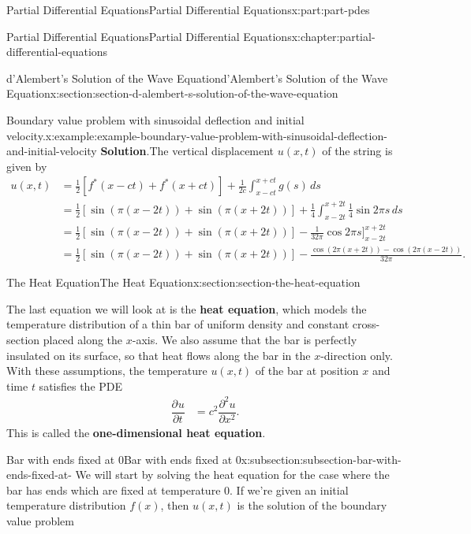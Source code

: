 \documentclass[oneside,10pt,]{book}
\newcommand{\blocktitlefont}{\relax}
\newcommand{\terminology}[1]{\textbf{#1}}
\numberwithin{equation}{part}
\newcommand{\pdv}[3][]{\dfrac{\partial^{#1} #2}{\partial #3^{#1}}}
\newcommand{\amp}{&}
\begin{document}
\begin{partptx}{Partial Differential Equations}{}{Partial Differential Equations}{}{}{x:part:part-pdes}
\begin{chapterptx}{Partial Differential Equations}{}{Partial Differential Equations}{}{}{x:chapter:partial-differential-equations}
\begin{sectionptx}{d'Alembert's Solution of the Wave Equation}{}{d'Alembert's Solution of the Wave Equation}{}{}{x:section:section-d-alembert-s-solution-of-the-wave-equation}
\begin{example}{Boundary value problem with sinusoidal deflection and initial velocity.}{x:example:example-boundary-value-problem-with-sinusoidal-deflection-and-initial-velocity}
\noindent\textbf{\blocktitlefont Solution}.\hypertarget{g:solution:idp105548780936096}{}\quad{}The vertical displacement \(u(x,t)\) of the string is given by%
%
\begin{align*}
u(x,t) \amp = \frac{1}{2}[f^{*}(x-ct)+f^{*}(x+ct)] + \frac{1}{2c}\int_{x-ct}^{x+ct}g(s)\,ds \\
\amp = \frac{1}{2}[\sin(\pi(x-2t))+\sin(\pi(x+2t))] + \frac{1}{4}\int_{x-2t}^{x+2t}\frac{1}{4}\sin2\pi s\,ds \\
\amp = \frac{1}{2}[\sin(\pi(x-2t))+\sin(\pi(x+2t))] - \frac{1}{32\pi}\cos2\pi s\Bigg]_{x-2t}^{x+2t} \\
\amp = \frac{1}{2}[\sin(\pi(x-2t))+\sin(\pi(x+2t))] - \frac{\cos(2\pi(x+2t)) - \cos(2\pi(x-2t))}{32\pi} \text{.}
\end{align*}
\end{example}
\end{sectionptx}
%
%
\typeout{************************************************}
\typeout{************************************************}
%
\begin{sectionptx}{The Heat Equation}{}{The Heat Equation}{}{}{x:section:section-the-heat-equation}
\begin{introduction}{}%
The last equation we will look at is the \terminology{heat equation}, which models the temperature distribution of a thin bar of uniform density and constant cross-section placed along the \(x\)-axis. We also assume that the bar is perfectly insulated on its surface, so that heat flows along the bar in the \(x\)-direction only. With these assumptions, the temperature \(u(x,t)\) of the bar at position \(x\) and time \(t\) satisfies the PDE%
%
\begin{align*}
\pdv{u}{t} \amp = c^{2}\pdv[2]{u}{x} \text{.}
\end{align*}
This is called the \terminology{one-dimensional heat equation}.%
\end{introduction}%
%
%
\typeout{************************************************}
\typeout{************************************************}
%
\begin{subsectionptx}{Bar with ends fixed at \(0\)}{}{Bar with ends fixed at \(0\)}{}{}{x:subsection:subsection-bar-with-ends-fixed-at-}
We will start by solving the heat equation for the case where the bar has ends which are fixed at temperature \(0\). If we're given an initial temperature distribution \(f(x)\), then \(u(x,t)\) is the solution of the boundary value problem%

\end{subsectionptx}
\end{sectionptx}
\end{chapterptx}
\end{partptx}
\end{document}
